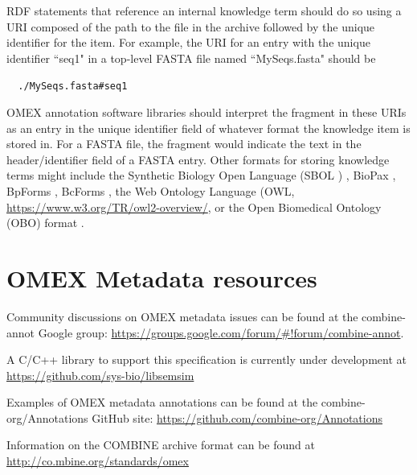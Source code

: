 \documentclass[pdftex,rgb,dvipsnames,svgnames,hyperref,table]{report}
\begin{document}
RDF statements that reference an internal knowledge term should do so using a URI composed of the path to the file in the archive followed by the unique identifier for the item. For example, the URI for an entry with the unique identifier ``seq1" in a top-level FASTA file named ``MySeqs.fasta" should be

\verb|  ./MySeqs.fasta#seq1|

OMEX annotation software libraries should interpret the fragment in these URIs as an entry in the unique identifier field of whatever format the knowledge item is stored in. For a FASTA file, the fragment would indicate the text in the header/identifier field of a FASTA entry. Other formats for storing knowledge terms might include the Synthetic Biology Open Language (SBOL \cite{SBOL}) , BioPax \cite{BioPax},  BpForms \cite{bpforms}, BcForms \cite{bpforms}, the Web Ontology Language (OWL, \url{https://www.w3.org/TR/owl2-overview/}, or the Open Biomedical Ontology (OBO) format \cite{OBO}.





\section{OMEX Metadata resources}

Community discussions on OMEX metadata issues can be found at the combine-annot Google group: \url{https://groups.google.com/forum/#!forum/combine-annot}.

A C/C++ library to support this specification is currently under development at \url{https://github.com/sys-bio/libsemsim}

Examples of OMEX metadata annotations can be found at the combine-org/Annotations GitHub site: \url{https://github.com/combine-org/Annotations}

Information on the COMBINE archive format can be found at \url{http://co.mbine.org/standards/omex}


\pagebreak
\end{document}
